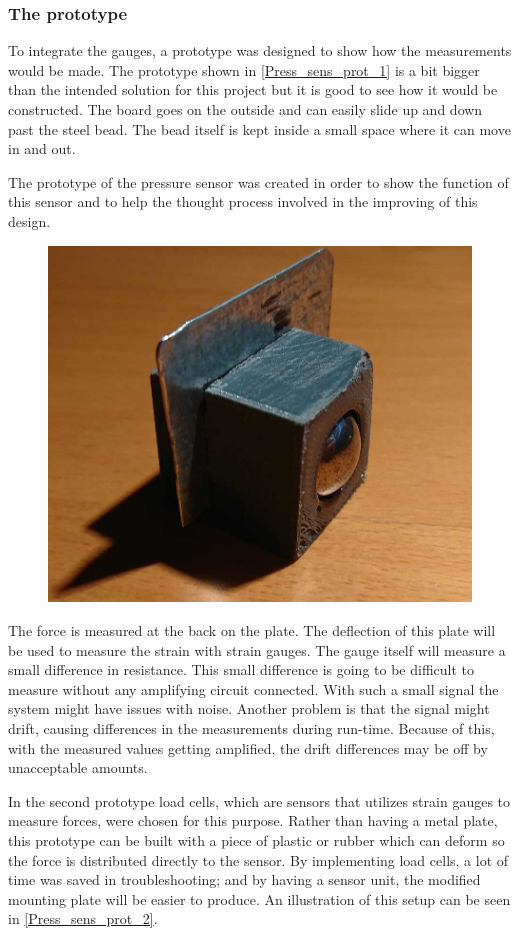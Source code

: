 \subsubsection{The prototype}
To integrate the gauges, a prototype was designed to show how the measurements would be made. The prototype shown in \autoref{Press_sens_prot_1} is a bit bigger than the intended solution for this project but it is good to see how it would be constructed. The board goes on the outside and can easily slide up and down past the steel bead. The bead itself is kept inside a small space where it can move in and out.

The prototype of the pressure sensor was created in order to show the function of this sensor and to help the thought process involved in the improving of this design.

\begin{figure}[H]
\begin{center}
	\includegraphics[width = .45\textwidth]{Figures/Press_sens_prot_1.jpg}
	\label{Press_sens_prot_1}
\end{center}
\end{figure}

The force is measured at the back on the plate. The deflection of this plate will be used to measure the strain with strain gauges. 
The gauge itself will measure a small difference in resistance. This small difference is going to be difficult to measure without any amplifying circuit connected. With such a small signal the system might have issues with noise. Another problem is that the signal might drift, causing differences in the measurements during run-time. Because of this, with the measured values getting amplified, the drift differences may be off by unacceptable amounts. 

In the second prototype load cells, which are sensors that utilizes strain gauges to measure forces, were chosen for this purpose. Rather than having a metal plate, this prototype can be built with a piece of plastic or rubber which can deform so the force is distributed directly to the sensor. By implementing load cells, a lot of time was saved in troubleshooting; and by having a sensor unit, the modified mounting plate will be easier to produce. An illustration of this setup can be seen in \autoref{Press_sens_prot_2}.
 
